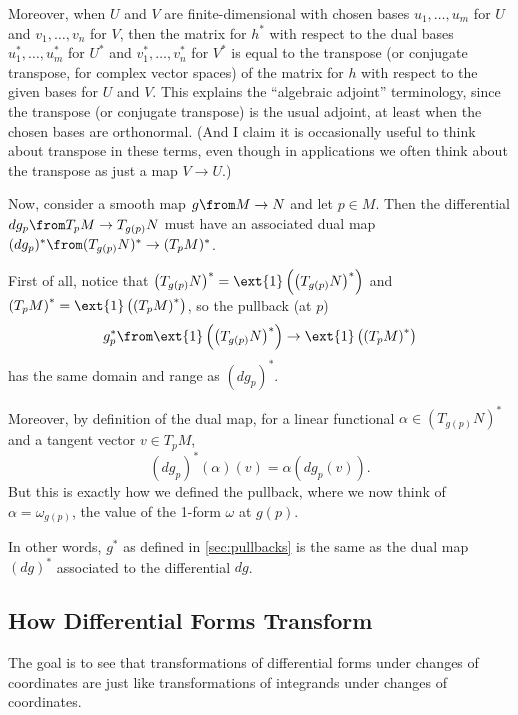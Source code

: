 Moreover, when $U$ and $V$ are finite-dimensional with chosen bases $u_1, \dots , u_m$ for $U$ and $v_1, \dots , v_n$ for $V$, then the matrix for $h^\ast$ with respect to the dual bases $u_1^\ast, \dots , u_m^\ast$ for $U^\ast$ and $v_1^\ast , \dots , v_n^\ast$ for $V^\ast$ is equal to the transpose (or conjugate transpose, for complex vector spaces) of the matrix for $h$ with respect to the given bases for $U$ and $V$. This explains the ``algebraic adjoint'' terminology, since the transpose (or conjugate transpose) is the usual adjoint, at least when the chosen bases are orthonormal. (And I claim it is occasionally useful to think about transpose in these terms, even though in applications we often think about the transpose as just a map $V \to U$.)

Now, consider a smooth map $g \from M \to N$ and let $p \in M$. Then the differential $dg_p \from T_pM \to T_{g(p)}N$ must have an associated dual map $(dg_p)^\ast \from (T_{g(p)}N)^\ast \to (T_pM)^\ast$.

First of all, notice that $\left(T_{g(p)}N\right)^\ast = \ext{1}\left(\left(T_{g(p)}N\right)^\ast\right)$ and $\left(T_pM\right)^\ast = \ext{1}\left(\left(T_pM\right)^\ast\right)$, so the pullback (at $p$)
\[
	g_p^\ast \from \ext{1}\left(\left(T_{g(p)}N\right)^\ast\right)\to \ext{1}\left(\left(T_pM\right)^\ast\right)
\]
has the same domain and range as $(dg_p)^\ast$.

Moreover, by definition of the dual map, for a linear functional $\alpha \in (T_{g(p)}N)^\ast$ and a tangent vector $v \in T_pM$,
\[
	(dg_p)^\ast (\alpha)(v) = \alpha(dg_p(v)).
\]
But this is exactly how we defined the pullback, where we now think of $\alpha = \omega_{g(p)}$, the value of the 1-form $\omega$ at $g(p)$.

In other words, $g^\ast$ as defined in \cref{sec:pullbacks} is the same as the dual map $(dg)^\ast$ associated to the differential $dg$.

\subsection{How Differential Forms Transform} 
\label{sub:how_differential_forms_transform}

The goal is to see that transformations of differential forms under changes of coordinates are just like transformations of integrands under changes of coordinates.

